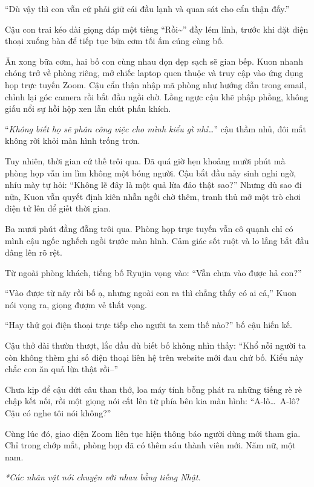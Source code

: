 \documentclass[../main.tex]{subfiles}
\begin{document}
``Dù vậy thì con vẫn cứ phải giữ cái đầu lạnh và quan sát cho cẩn thận đấy.''

Cậu con trai kéo dài giọng đáp một tiếng ``Rồi\~{}'' đầy lém lỉnh, trước khi đặt điện thoại xuống bàn để tiếp tục bữa cơm tối ấm cúng cùng bố.

\ct

Ăn xong bữa cơm, hai bố con cùng nhau dọn dẹp sạch sẽ gian bếp. Kuon nhanh chóng trở về phòng riêng, mở chiếc laptop quen thuộc và truy cập vào ứng dụng họp trực tuyến Zoom. Cậu cẩn thận nhập mã phòng như hướng dẫn trong email, chỉnh lại góc camera rồi bắt đầu ngồi chờ. Lồng ngực cậu khẽ phập phồng, không giấu nổi sự hồi hộp xen lẫn chút phấn khích.

``\textit{Không biết họ sẽ phân công việc cho mình kiểu gì nhỉ\dots}'' cậu thầm nhủ, đôi mắt không rời khỏi màn hình trống trơn.

Tuy nhiên, thời gian cứ thế trôi qua. Đã quá giờ hẹn khoảng mười phút mà phòng họp vẫn im lìm không một bóng người. Cậu bắt đầu nảy sinh nghi ngờ, nhíu mày tự hỏi: ``Không lẽ đây là một quả lừa đảo thật sao?'' Nhưng dù sao đi nữa, Kuon vẫn quyết định kiên nhẫn ngồi chờ thêm, tranh thủ mở một trò chơi điện tử lên để giết thời gian.

Ba mươi phút đằng đẵng trôi qua. Phòng họp trực tuyến vẫn cô quạnh chỉ có mình cậu ngốc nghếch ngồi trước màn hình. Cảm giác sốt ruột và lo lắng bắt đầu dâng lên rõ rệt.

Từ ngoài phòng khách, tiếng bố Ryujin vọng vào: ``Vẫn chưa vào được hả con?''

``Vào được từ nãy rồi bố ạ, nhưng ngoài con ra thì chẳng thấy có ai cả,'' Kuon nói vọng ra, giọng đượm vẻ thất vọng.

``Hay thử gọi điện thoại trực tiếp cho người ta xem thế nào?'' bố cậu hiến kế.

Cậu thở dài thườn thượt, lắc đầu dù biết bố không nhìn thấy: ``Khổ nỗi người ta còn không thèm ghi số điện thoại liên hệ trên website mới đau chứ bố. Kiểu này chắc con ăn quả lừa thật rồi--''

Chưa kịp để cậu dứt câu than thở, loa máy tính bỗng phát ra những tiếng rè rè chập kết nối, rồi một giọng nói cất lên từ phía bên kia màn hình: ``A-lô\dots\ A-lô? Cậu có nghe tôi nói không?''

Cùng lúc đó, giao diện Zoom liên tục hiện thông báo người dùng mới tham gia. Chỉ trong chớp mắt, phòng họp đã có thêm sáu thành viên mới. Năm nữ, một nam.

\begin{center}
  {\textit{*Các nhân vật nói chuyện với nhau bằng tiếng Nhật.}}
\end{center}
\end{document}
